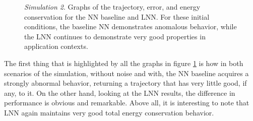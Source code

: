 \documentclass[a4paper]{article}
\begin{document}
\begin{figure}
    \centering
    \qquad
    \caption{\textit{Simulation 2}. Graphs of the trajectory, error, and energy conservation for the NN baseline and LNN. For these initial conditions, the baseline NN demonstrates anomalous behavior, while the LNN continues to demonstrate very good properties in application contexts.}
    \label{fig:rigid_0degrees_4rads}
\end{figure}

The first thing that is highlighted by all the graphs in figure \ref{fig:rigid_0degrees_4rads} is how in both scenarios of the simulation, without noise and with, the NN baseline acquires a strongly abnormal behavior, returning a trajectory that has very little good, if any, to it. On the other hand, looking at the LNN results, the difference in performance is obvious and remarkable. Above all, it is interesting to note that LNN again maintains very good total energy conservation behavior.\\
\end{document}
